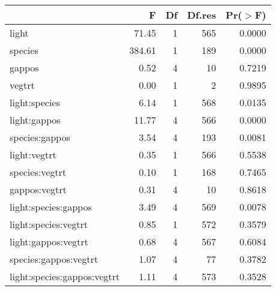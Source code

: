 \begin{tabular}{lrrrr}
  \hline
 & F & Df & Df.res & Pr($>$F) \\ 
  \hline
light & 71.45 & 1 & 565 & 0.0000 \\ 
  species & 384.61 & 1 & 189 & 0.0000 \\ 
  gappos & 0.52 & 4 & 10 & 0.7219 \\ 
  vegtrt & 0.00 & 1 & 2 & 0.9895 \\ 
  light:species & 6.14 & 1 & 568 & 0.0135 \\ 
  light:gappos & 11.77 & 4 & 566 & 0.0000 \\ 
  species:gappos & 3.54 & 4 & 193 & 0.0081 \\ 
  light:vegtrt & 0.35 & 1 & 566 & 0.5538 \\ 
  species:vegtrt & 0.10 & 1 & 168 & 0.7465 \\ 
  gappos:vegtrt & 0.31 & 4 & 10 & 0.8618 \\ 
  light:species:gappos & 3.49 & 4 & 569 & 0.0078 \\ 
  light:species:vegtrt & 0.85 & 1 & 572 & 0.3579 \\ 
  light:gappos:vegtrt & 0.68 & 4 & 567 & 0.6084 \\ 
  species:gappos:vegtrt & 1.07 & 4 & 77 & 0.3782 \\ 
  light:species:gappos:vegtrt & 1.11 & 4 & 573 & 0.3528 \\ 
   \hline
\end{tabular}
